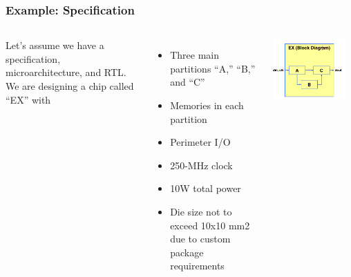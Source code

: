 \documentclass[compress]{beamer}
\begin{document}
\begin{frame}
	\frametitle{Example: Specification}
	\begin{columns}	
		Let’s assume we have a specification,
		microarchitecture, and RTL.
		\newline
		We are designing a chip called “EX”
		with
		\begin{itemize}
			\item Three main partitions “A,” “B,” and
			“C”
			\item Memories in each partition
			\item Perimeter I/O
			\item 250-MHz clock
			\item 10W total power
			\item Die size not to exceed 10x10 mm2
			due to custom package
			requirements
		\end{itemize}
		\begin{center}
			\includegraphics[width=0.9\textwidth]{block}
		\end{center}
	\end{columns}
\end{frame}
\end{document}
